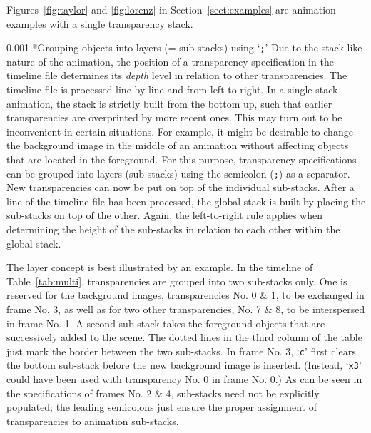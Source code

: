 \documentclass[a4paper]{article}
\makeatletter
\newcommand\myparagraph{\@startsection{paragraph}{3}{\z@}%
                                     {\parskip}%
                                     {0.001\parskip}%
                                     {\itshape\normalsize}}
\makeatother
\begin{document}
Figures~\ref{fig:taylor} and \ref{fig:lorenz} in Section~\ref{sect:examples} are animation examples with a single transparency stack.

\myparagraph*{Grouping objects into layers (= sub-stacks) using `{\tt;}'}
Due to the stack-like nature of the animation, the position of a transparency specification in the timeline file determines its \emph{depth} level in relation to other transparencies. The timeline file is processed line by line and from left to right. In a single-stack animation, the stack is strictly built from the bottom up, such that earlier transparencies are overprinted by more recent ones. This may turn out to be inconvenient in certain situations. For example, it might be desirable to change the background image in the middle of an animation without affecting objects that are located in the foreground. For this purpose, transparency specifications can be grouped into layers (sub-stacks) using the semicolon (\verb+;+) as a separator. New transparencies can now be put on top of the individual sub-stacks. After a line of the timeline file has been processed, the global stack is built by placing the sub-stacks on top of the other. Again, the left-to-right rule applies when determining the height of the sub-stacks in relation to each other within the global stack.

The layer concept is best illustrated by an example. In the timeline of Table~\ref{tab:multi}, transparencies are grouped into two sub-stacks only. One is reserved for the background images, transparencies No. 0 \& 1, to be exchanged in frame No. 3, as well as for two other transparencies, No. 7 \& 8, to be interspersed in frame No. 1. A second sub-stack takes the foreground objects that are successively added to the scene. The dotted lines in the third column of the table just mark the border between the two sub-stacks. In frame No. 3, `\verb+c+' first clears the bottom sub-stack before the new background image is inserted. (Instead, `\verb+x3+' could have been used with transparency No. 0 in frame No. 0.) As can be seen in the specifications of frames No. 2 \& 4, sub-stacks need not be explicitly populated; the leading semicolons just ensure the proper assignment of transparencies to animation sub-stacks.
\end{document}
